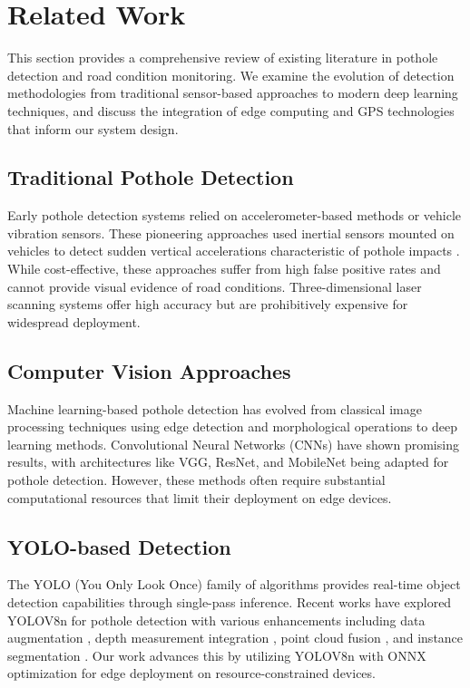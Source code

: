 \documentclass{ieeeaccess}
\begin{document}
\section{Related Work}

This section provides a comprehensive review of existing literature in pothole detection and road condition monitoring. We examine the evolution of detection methodologies from traditional sensor-based approaches to modern deep learning techniques, and discuss the integration of edge computing and GPS technologies that inform our system design.

\subsection{Traditional Pothole Detection}
Early pothole detection systems relied on accelerometer-based methods or vehicle vibration sensors. These pioneering approaches used inertial sensors mounted on vehicles to detect sudden vertical accelerations characteristic of pothole impacts \cite{b1}. While cost-effective, these approaches suffer from high false positive rates and cannot provide visual evidence of road conditions. Three-dimensional laser scanning systems offer high accuracy but are prohibitively expensive for widespread deployment.

\subsection{Computer Vision Approaches}
Machine learning-based pothole detection has evolved from classical image processing techniques using edge detection and morphological operations to deep learning methods. Convolutional Neural Networks (CNNs) have shown promising results, with architectures like VGG, ResNet, and MobileNet being adapted for pothole detection. However, these methods often require substantial computational resources that limit their deployment on edge devices.

\subsection{YOLO-based Detection}
The YOLO (You Only Look Once) family of algorithms provides real-time object detection capabilities through single-pass inference. Recent works have explored YOLOV8n for pothole detection with various enhancements including data augmentation \cite{b2}, depth measurement integration \cite{b3}, point cloud fusion \cite{b4}, and instance segmentation \cite{b5, b6}. Our work advances this by utilizing YOLOV8n with ONNX optimization for edge deployment on resource-constrained devices.
\end{document}
